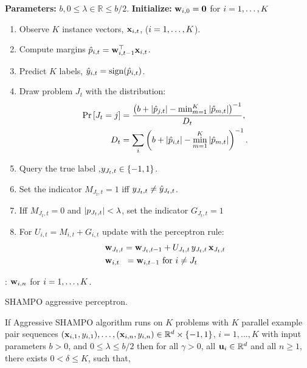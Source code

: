 {\begin{algorithm}[h]
\begin{algorithmic}
   \State \textbf{Parameters:}  $b, 0 \le \lambda \in\mathbb{R} \le b/2$.
   \State \textbf{Initialize:}  $\mathbf{w}_{i,0}={\boldsymbol{0}}$ for $i=1, \ldots , K$ \\
\begin{enumerate}
\nolineskips
\item Observe $K$ instance vectors, $\mathbf{x}_{i,t}$, ($i=1 , \ldots , K$).
\item Compute margins $\hat{p}_{i,t}={\mathbf{w}}^{\top}_{i,t-1} \mathbf{x}_{i,t}$.
\item Predict $K$ labels, $\hat{y}_{i,t}={\rm sign}(\hat{p}_{i,t})$.
\item Draw problem $J_t$  with the distribution:
\begin{align}
{\rm Pr}\left[{J_t=j}\right] &=
\frac{\left({b+\left\vert{\hat{p}_{j,t}}\right\vert-\min_{m=1}^K\left\vert{\hat{p}_{m,t}}\right\vert}\right)^{-1}}{D_{t}}, ~\nonumber\\
D_t &=
\sum_i \left({b+\left\vert{\hat{p}_{i,t}}\right\vert-\min_{m=1}^K\left\vert{\hat{p}_{m,t}}\right\vert}\right)^{-1}. \nonumber
\end{align}
\item Query the true label ,$y_{J_t,t}\in\{-1,1\}$.
\item Set the indicator $M_{J_t, t}=1$ iff $y_{J_t,t} \neq \hat{y}_{J_t,t}$.
\item Iff $M_{J_t, t}=0$ and $\left\vert{p_{J_t,t}}\right\vert<\lambda$, set  the indicator $G_{J_t,t}=1$
\item For $U_{i,t}=M_{i,t}+G_{i,t}$ update with the perceptron rule:
\begin{align}
&\mathbf{w}_{J_t,t} = \mathbf{w}_{J_t,t-1}+U_{J_t,t} \, y_{J_t,t}\, \mathbf{x}_{J_t,t}  \nonumber\\
&\mathbf{w}_{i,t} ~~= \mathbf{w}_{i,t-1}  \textrm{ for } i \neq J_t \nonumber
\end{align}
\end{enumerate}
   \EndFor  
   : $\mathbf{w}_{i,n}$ for $i=1 , \ldots , K$.
\end{algorithmic}
\caption{SHAMPO aggressive perceptron.}
\label{alg:SHAMPO_FO_aggressive}
\end{algorithm}    


  


\begin{theorem}
  If Aggressive SHAMPO algorithm runs on $K$ problems with $K$ parallel example pair
  sequences
  $(\mathbf{x}_{i,1},y_{i,1}),\ldots,(\mathbf{x}_{i,n},y_{i,n})\in\mathbb{R}^d\times\{-1,1\}$,
  $i=1,...,K$ with input parameters $b>0$, and $0 \le \lambda \le b/2$ then for all $\gamma>0$, all
  $\mathbf{u}_{i}\in\mathbb{R}^d$ and all $n\ge1$, there exists $0<\delta\le K$, such that,
  

\end{theorem}}
